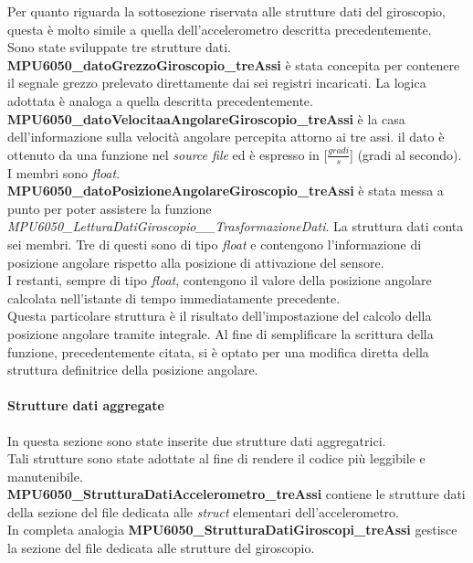 \newpage

Per quanto riguarda la sottosezione riservata alle strutture dati del giroscopio, questa è  molto simile a quella dell'accelerometro descritta precedentemente.\\
Sono state sviluppate tre strutture dati.\\
\textbf{MPU6050\_datoGrezzoGiroscopio\_treAssi} è stata concepita per contenere il segnale grezzo prelevato direttamente dai sei registri incaricati. La logica adottata è analoga a quella descritta precedentemente.\\
\textbf{MPU6050\_datoVelocitaaAngolareGiroscopio\_treAssi} è la casa dell'informazione sulla velocità angolare percepita attorno ai tre assi. il dato è ottenuto da una funzione nel \textit{source file} ed è espresso in [$\frac{gradi}{s}$] (gradi al secondo). I membri sono \textit{float}.\\
\textbf{MPU6050\_datoPosizioneAngolareGiroscopio\_treAssi} è stata messa a punto per poter assistere la funzione \textit{MPU6050\_LetturaDatiGiroscopio\_\_TrasformazioneDati}. La struttura dati conta sei membri. Tre di questi sono di tipo \textit{float} e contengono l'informazione di posizione angolare rispetto alla posizione di attivazione del sensore.\\
I restanti, sempre di tipo \textit{float}, contengono il valore della posizione angolare calcolata nell'istante di tempo immediatamente precedente.\\
Questa particolare struttura è il risultato dell'impostazione del calcolo della posizione angolare tramite integrale. Al fine di semplificare la scrittura della funzione, precedentemente citata, si è optato per una modifica diretta della struttura definitrice della posizione angolare.


\paragraph{Strutture dati aggregate}
In questa sezione sono state inserite due strutture dati aggregatrici.\\
Tali strutture sono state adottate al fine di rendere il codice più leggibile e manutenibile.\\
\textbf{MPU6050\_StrutturaDatiAccelerometro\_treAssi} contiene le strutture dati della sezione del file dedicata alle \textit{struct} elementari dell'accelerometro.\\In completa analogia
\textbf{MPU6050\_StrutturaDatiGiroscopi\_treAssi} gestisce la sezione del file dedicata alle strutture del giroscopio.



